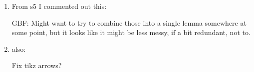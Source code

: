 \begin{enumerate}
	\item From s5 I commented out this:

	GBF: Might want to try to combine those into a single lemma somewhere at some point, but it looks like it might be less messy, if a bit redundant, not to.

	\item also:

	Fix tikz arrows?

\begin{comment}
	\item \sout{Picture for creasing.}
	\item Compactness and orientation assumptions on Theorem 3.13 (transversality constrains preserve q-iso type).

    \item \sout{Treatment of creasing.}
    \item Guillemin-Pollock for mnfds with corner.

    \item Clarify isomorphisms used in orientations and make more explicit how the Lipyanskiy orientations fit.


	\item More on Mayer-Vietoris - check full argument
	\item Poincar\'e Lemma - check new proof
	\item (Anibal) Add a better treatment of ``cst" from \verb|Flows/old/pd_cubical_S2.Feb16.tex| \\
	Greg: Let K be any finite set of cubical faces and let L be a single cubical face. We need $cst(K) \cup cst(L)$ to be $cst(K \cup L)$ (maybe this part is just by definition?) and we need $cst(K) \cap cst(L)$ to be $cst(K ? L)$ where $K ? L$ needs to be some set of faces with cardinality less than or equal to that of K.
\end{comment}

	\begin{comment}
		\item \sout{Picture for creasing.}
		\item Compactness and orientation assumptions on Theorem 3.13 (transversality constrains preserve q-iso type).

		\item \sout{Treatment of creasing.}
		\item Guillemin-Pollock for mnfds with corner.

		\item Clarify isomorphisms used in orientations and make more explicit how the Lipyanskiy orientations fit.


\end{comment}
\end{enumerate}
